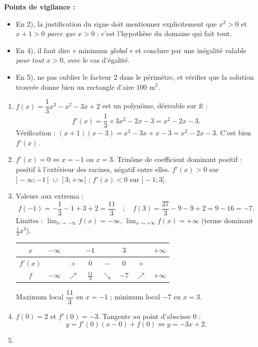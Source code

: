 \documentclass[11pt]{article}
\begin{document}
\begin{corrige}
\textbf{Points de vigilance :}
\begin{itemize}
\item En 2), la justification du signe doit mentionner explicitement que $x^2>0$ et $x+1>0$ \emph{parce que} $x>0$ : c'est l'hypothèse du domaine qui fait tout.
\item En 4), il faut dire « minimum \emph{global} » et conclure par une inégalité valable \emph{pour tout} $x>0$, avec le cas d'égalité.
\item En 5), ne pas oublier le facteur $2$ dans le périmètre, et vérifier que la solution trouvée donne bien un rectangle d'aire $100$ m$^2$.
\end{itemize}
\end{corrige}

\begin{corrige}
\begin{enumerate}
\item $f(x)=\dfrac{1}{3}x^3-x^2-3x+2$ est un polynôme, dérivable sur $\mathbb{R}$ :
\[ f'(x)=\frac{1}{3}\times 3x^2-2x-3=x^2-2x-3. \]
Vérification : $(x+1)(x-3)=x^2-3x+x-3=x^2-2x-3$. C'est bien $f'(x)$.
\item $f'(x)=0 \iff x=-1$ ou $x=3$. Trinôme de coefficient dominant positif : positif à l'extérieur des racines, négatif entre elles.
$f'(x)>0$ sur $]-\infty;-1[\,\cup\,]3;+\infty[$ ; $f'(x)<0$ sur $]-1;3[$.
\item Valeurs aux extrema :
\[ f(-1)=-\frac{1}{3}-1+3+2=\frac{11}{3} \quad ; \quad f(3)=\frac{27}{3}-9-9+2=9-16=-7. \]
Limites : $\lim_{x\to-\infty}f(x)=-\infty$, $\lim_{x\to+\infty}f(x)=+\infty$ (terme dominant $\frac{1}{3}x^3$).
\begin{center}
\begin{tabular}{|c|ccccccc|}
\hline
$x$ & $-\infty$ & & $-1$ & & $3$ & & $+\infty$ \\
\hline
$f'(x)$ & & $+$ & $0$ & $-$ & $0$ & $+$ & \\
\hline
$f$ & $-\infty$ & $\nearrow$ & $\frac{11}{3}$ & $\searrow$ & $-7$ & $\nearrow$ & $+\infty$ \\
\hline
\end{tabular}
\end{center}
Maximum local $\dfrac{11}{3}$ en $x=-1$ ; minimum local $-7$ en $x=3$.
\item $f(0)=2$ et $f'(0)=-3$. Tangente au point d'abscisse $0$ :
\[ y=f'(0)(x-0)+f(0) \iff y=-3x+2. \]
\item \begin{enumerate}

\end{enumerate}
\end{enumerate}
\end{corrige}
\end{document}
